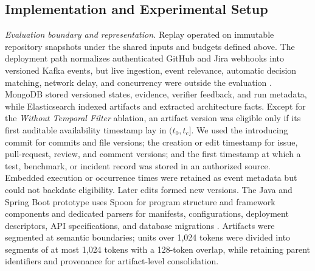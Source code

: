 \documentclass[10pt,conference]{IEEEtran}
\begin{document}
\subsection{Implementation and Experimental Setup}\label{subsec:implementation}
\noindent\textit{Evaluation boundary and representation.} Replay operated on immutable repository snapshots under the shared inputs and budgets defined above. The deployment path normalizes authenticated GitHub and Jira webhooks into versioned Kafka events, but live ingestion, event relevance, automatic decision matching, network delay, and concurrency were outside the evaluation \cite{GitHubWebhookValidation2026,GitHubWebhookHandling2026,AtlassianJiraWebhooks2026,Kreps2011Kafka,ApacheKafkaDesign2026}. MongoDB stored versioned states, evidence, verifier feedback, and run metadata, while Elasticsearch indexed artifacts and extracted architecture facts. Except for the \emph{Without Temporal Filter} ablation, an artifact version was eligible only if its first auditable availability timestamp lay in $(t_0,t_c]$. We used the introducing commit for commits and file versions; the creation or edit timestamp for issue, pull-request, review, and comment versions; and the first timestamp at which a test, benchmark, or incident record was stored in an authorized source. Embedded execution or occurrence times were retained as event metadata but could not backdate eligibility. Later edits formed new versions. The Java and Spring Boot prototype uses Spoon for program structure and framework components and dedicated parsers for manifests, configurations, deployment descriptors, API specifications, and database migrations \cite{Pawlak2016Spoon}. Artifacts were segmented at semantic boundaries; units over 1,024 tokens were divided into segments of at most 1,024 tokens with a 128-token overlap, while retaining parent identifiers and provenance for artifact-level consolidation.\par
\end{document}

